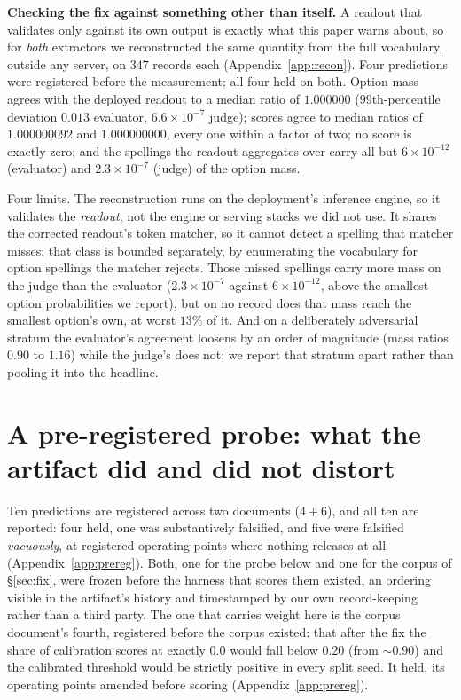 \documentclass{article}
\newif\ifclaimtags\claimtagsfalse
\newcommand{\ct}[1]{\ifclaimtags\hfill{\scriptsize\textcolor{gray}{[#1]}}\fi}
\begin{document}
\textbf{Checking the fix against something other than itself.} A readout that
validates only against its own output is exactly what this paper warns about, so
for \emph{both} extractors we reconstructed the same quantity from the full
vocabulary, outside any server, on $347$ records each
(Appendix~\ref{app:recon}). Four predictions were registered before the
measurement; all four held on both. Option mass agrees with the deployed readout
to a median ratio of $1.000000$ ($99$th-percentile deviation $0.013$ evaluator,
$6.6\times10^{-7}$ judge); scores agree to median ratios of $1.000000092$ and
$1.000000000$, every one within a factor of two; no score is exactly zero; and
the spellings the readout aggregates over carry all but $6\times10^{-12}$
(evaluator) and $2.3\times10^{-7}$ (judge) of the option mass.

Four limits. The reconstruction runs on the
deployment's inference engine, so it validates the \emph{readout}, not the engine
or serving stacks we did not use. It shares the
corrected readout's token matcher, so it cannot detect a spelling that matcher misses; that
class is bounded separately, by enumerating the vocabulary for option spellings
the matcher rejects. Those missed spellings carry more mass on the judge than the evaluator ($2.3\times10^{-7}$ against $6\times10^{-12}$, above the smallest option probabilities we report), but on no record does that mass reach the
smallest option's own, at worst $13\%$ of it. And on a deliberately
adversarial stratum the evaluator's agreement loosens by an order of magnitude
(mass ratios $0.90$ to $1.16$) while the judge's does not; we report that stratum
apart rather than pooling it into the headline.\ct{C60, C61, C72, C73}

\section{A pre-registered probe: what the artifact did and did not
distort}\label{sec:probe}
Ten predictions are registered across two documents ($4+6$), and all
ten are reported: four held, one was substantively falsified, and five were
falsified \emph{vacuously}, at registered operating points where nothing releases
at all (Appendix~\ref{app:prereg}). Both, one for the probe below and one for the corpus of \S\ref{sec:fix}, were frozen before the harness that scores
them existed, an ordering visible in the artifact's history and timestamped by
our own record-keeping rather than a third party. The one that carries weight here is the corpus
document's fourth, registered before the corpus existed: that after the fix the
share of calibration scores at exactly $0.0$ would fall below $0.20$ (from
${\sim}0.90$) and the calibrated threshold would be strictly positive in every
split seed. It held, its operating points amended before scoring
(Appendix~\ref{app:prereg}).\ct{C19, C43}
\end{document}
